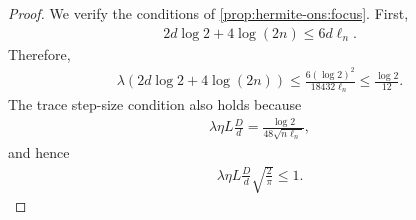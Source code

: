 \documentclass{article}
\theoremstyle{plain}
\theoremstyle{definition}
\theoremstyle{plain}
\begin{document}
\begin{proof}
    We verify the conditions of
    \cref{prop:hermite-ons:focus}. First,
    \begin{align}
        2d\log2+4\log(2n)
        \leq
        6d\ell_n.
    \end{align}
    Therefore,
    \begin{align}
        \lambda
        \left(
        2d\log2+4\log(2n)
        \right)
        \leq
        \frac{6(\log2)^2}{18432\ell_n}
        \leq
        \frac{\log2}{12}.
    \end{align}
    The trace step-size condition also holds because
    \begin{align}
        \lambda\eta L\frac{D}{d}
        =
        \frac{\log2}{48\sqrt{n\ell_n}},
    \end{align}
    and hence
    \begin{align}
        \lambda\eta L\frac{D}{d}
        \sqrt{\frac{2}{\pi}}
        \leq1.
    \end{align}


\end{proof}
\end{document}

